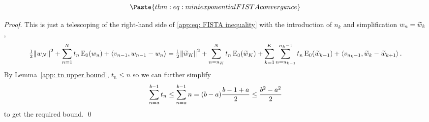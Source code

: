 \documentclass[smallextended]{svjour3}
\newcommand{\norm}[1]{{\left\lVert #1 \right\rVert}}
\newcommand{\IP}[2]{\left\langle #1,#2 \right\rangle}
\newcommand{\op}[1]{\operatorname{#1}}
\newcommand{\1}{\F{1}}
\newcommand*{\varf}[1]{%
	\IfEqCase{#1}{%
		{0}{u}%
		{1}{v}%
		{2}{w}%
	}[u#1]%
}
\newcommand*{\vars}[1]{%
	\IfEqCase{#1}{%
		{0}{\alpha}%
		{1}{\beta}%
		{2}{\gamma}%
		{3}{a}%
		{4}{b}%
		{5}{c}%
	}[k#1]%
}
\begin{document}
	
	
	\begin{lemma}\label{app:thm: mini exponential FISTA convergence}
		\begin{equation}
			\Paste{thm:eq: mini exponential FISTA convergence}
		\end{equation}
	\end{lemma}
	\begin{proof}
		This is just a telescoping of the right-hand side of \eqref{app:eq: FISTA inequality} with the introduction of $n_k$ and simplification $\varf2_n = \tilde{\varf2}_k$,
		\begin{equation}
			\tfrac12\norm{\varf2_N}^2 + \sum^N_{n=1} t_n\op{E}_0(\varf2_n) + \IP{\varf1_{n-1}}{\varf2_{n-1}-\varf2_n} = \tfrac12\norm{\tilde{\varf2}_K}^2 + \sum_{n=n_K}^Nt_n\op{E}_0(\tilde{\varf2}_K) 
			+ \sum_{k=1}^K\sum_{n=n_{k-1}}^{n_k-1}t_n\op{E}_0(\tilde{\varf2}_{k-1}) 
			+ \IP{\varf1_{n_k-1}}{\tilde{\varf2}_k-\tilde{\varf2}_{k+1}}.
		\end{equation}
		By Lemma~\ref{app: tn upper bound}, $t_n\leq n$ so we can further simplify
		$$\sum_{n=\vars3}^{\vars4-1}t_n \leq \sum_{n=\vars3}^{\vars4-1}n = (\vars4-\vars3)\frac{\vars4-1+\vars3}{2} \leq \frac{\vars4^2-\vars3^2}{2}$$
		to get the required bound.
		\qed\end{proof}
	
\end{document}
